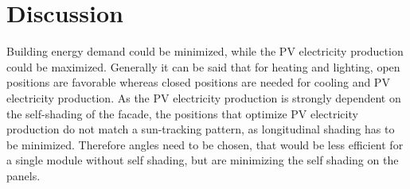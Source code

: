 \chapter{Discussion}
\label{ch:discussion}

Building energy demand could be minimized, while the PV electricity production could be maximized. Generally it can be said that for heating and lighting, open positions are favorable whereas closed positions are needed for cooling and PV electricity production. As the PV electricity production is strongly dependent on the self-shading of the facade, the positions that optimize PV electricity production do not match a sun-tracking pattern, as longitudinal shading has to be minimized. Therefore angles need to be chosen, that would be less efficient for a single module without self shading, but are minimizing the self shading on the panels. 
